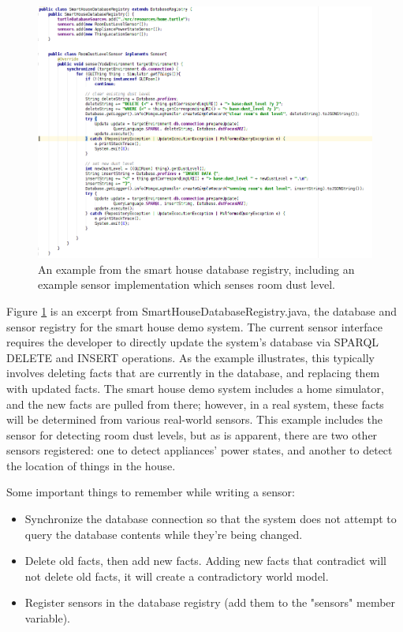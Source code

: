 \documentclass[titlepage]{article}
\begin{document}
\begin{figure}[h!]
\centering
\includegraphics[width=\textwidth]{smart_house_sensor_example}
\caption{An example from the smart house database registry, including an example sensor implementation which senses room dust level.}
\label{fig:sensor-example}
\end{figure}


Figure \ref{fig:sensor-example} is an excerpt from SmartHouseDatabaseRegistry.java, the database and sensor registry for the smart house demo system.
The current sensor interface requires the developer to directly update the system's database via SPARQL DELETE and INSERT operations.
As the example illustrates, this typically involves deleting facts that are currently in the database, and replacing them with updated facts.
The smart house demo system includes a home simulator, and the new facts are pulled from there; however, in a real system, these facts will be determined from various real-world sensors.
This example includes the sensor for detecting room dust levels, but as is apparent, there are two other sensors registered: one to detect appliances' power states, and another to detect the location of things in the house.

Some important things to remember while writing a sensor:
\begin{itemize}
\item Synchronize the database connection so that the system does not attempt to query the database contents while they're being changed.
\item Delete old facts, then add new facts. Adding new facts that contradict will not delete old facts, it will create a contradictory world model.
\item Register sensors in the database registry (add them to the "sensors" member variable).
\end{itemize}
\end{document}
